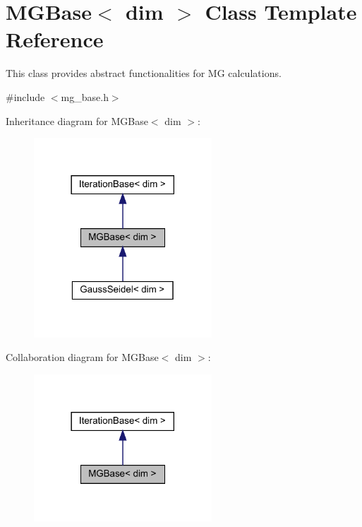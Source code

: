 \hypertarget{class_m_g_base}{}\section{M\+G\+Base$<$ dim $>$ Class Template Reference}
\label{class_m_g_base}


This class provides abstract functionalities for MG calculations.  




{\ttfamily \#include $<$mg\+\_\+base.\+h$>$}



Inheritance diagram for M\+G\+Base$<$ dim $>$\+:\nopagebreak
\begin{figure}[H]
\begin{center}
\leavevmode
\includegraphics[width=189pt]{class_m_g_base__inherit__graph}
\end{center}
\end{figure}


Collaboration diagram for M\+G\+Base$<$ dim $>$\+:\nopagebreak
\begin{figure}[H]
\begin{center}
\leavevmode
\includegraphics[width=189pt]{class_m_g_base__coll__graph}
\end{center}
\end{figure}
